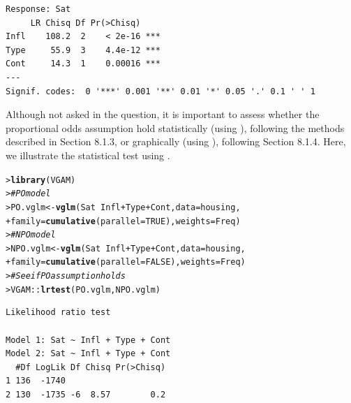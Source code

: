 \documentclass[10pt]{report}\usepackage[]{graphicx}\usepackage[]{color}
\makeatletter
\newcommand{\hlnum}[1]{\textcolor[rgb]{0.686,0.059,0.569}{#1}}%
\newcommand{\hlcom}[1]{\textcolor[rgb]{0.678,0.584,0.686}{\textit{#1}}}%
\newcommand{\hlopt}[1]{\textcolor[rgb]{0,0,0}{#1}}%
\newcommand{\hlstd}[1]{\textcolor[rgb]{0.345,0.345,0.345}{#1}}%
\newcommand{\hlkwb}[1]{\textcolor[rgb]{0.69,0.353,0.396}{#1}}%
\newcommand{\hlkwc}[1]{\textcolor[rgb]{0.333,0.667,0.333}{#1}}%
\newcommand{\hlkwd}[1]{\textcolor[rgb]{0.737,0.353,0.396}{\textbf{#1}}}%
\newenvironment{kframe}{%
 \def\at@end@of@kframe{}%
 \ifinner\ifhmode%
  \def\at@end@of@kframe{\end{minipage}}%
  \begin{minipage}{\columnwidth}%
 \fi\fi%
 \def\FrameCommand##1{\hskip\@totalleftmargin \hskip-\fboxsep
 \colorbox{shadecolor}{##1}\hskip-\fboxsep
     \hskip-\linewidth \hskip-\@totalleftmargin \hskip\columnwidth}%
 \MakeFramed {\advance\hsize-\width
   \@totalleftmargin\z@ \linewidth\hsize
   \@setminipage}}%
 {\par\unskip\endMakeFramed%
 \at@end@of@kframe}
\newenvironment{knitrout}{}{} %
\renewenvironment{knitrout}{\small\renewcommand{\baselinestretch}{.85}}{} %
\makeatother
\begin{document}
\begin{Exercises}
\begin{enumerate*}
\begin{ans}
\begin{knitrout}
\begin{kframe}
\begin{verbatim}
Response: Sat
     LR Chisq Df Pr(>Chisq)    
Infl    108.2  2    < 2e-16 ***
Type     55.9  3    4.4e-12 ***
Cont     14.3  1    0.00016 ***
---
Signif. codes:  0 '***' 0.001 '**' 0.01 '*' 0.05 '.' 0.1 ' ' 1
\end{verbatim}
\end{kframe}
\end{knitrout}
    Although not asked in the question, it is important to assess whether the proportional
    odds assumption hold statistically (using ),  following the methods described in Section 8.1.3, 
    or graphically (using ), following Section 8.1.4.  Here, we illustrate the statistical test
    using .
\begin{knitrout}\footnotesize
{}\color{fgcolor}\begin{kframe}
\begin{alltt}
\hlstd{> }\hlkwd{library}\hlstd{(VGAM)}
\hlstd{> }   \hlcom{# PO model}
\hlstd{> }\hlstd{PO.vglm} \hlkwb{<-} \hlkwd{vglm}\hlstd{(Sat} \hlopt{~} \hlstd{Infl} \hlopt{+} \hlstd{Type} \hlopt{+} \hlstd{Cont,} \hlkwc{data}\hlstd{=housing,}
\hlstd{+ }                \hlkwc{family}\hlstd{=}\hlkwd{cumulative}\hlstd{(}\hlkwc{parallel}\hlstd{=}\hlnum{TRUE}\hlstd{),} \hlkwc{weights}\hlstd{=Freq)}
\hlstd{> }   \hlcom{# NPO model}
\hlstd{> }\hlstd{NPO.vglm} \hlkwb{<-} \hlkwd{vglm}\hlstd{(Sat} \hlopt{~} \hlstd{Infl} \hlopt{+} \hlstd{Type} \hlopt{+} \hlstd{Cont,} \hlkwc{data}\hlstd{=housing,}
\hlstd{+ }                 \hlkwc{family}\hlstd{=}\hlkwd{cumulative}\hlstd{(}\hlkwc{parallel}\hlstd{=}\hlnum{FALSE}\hlstd{),} \hlkwc{weights}\hlstd{=Freq)}
\hlstd{> }   \hlcom{# See if PO assumption holds}
\hlstd{> }\hlstd{VGAM}\hlopt{::}\hlkwd{lrtest}\hlstd{(PO.vglm, NPO.vglm)}
\end{alltt}
\begin{verbatim}
Likelihood ratio test

Model 1: Sat ~ Infl + Type + Cont
Model 2: Sat ~ Infl + Type + Cont
  #Df LogLik Df Chisq Pr(>Chisq)
1 136  -1740                    
2 130  -1735 -6  8.57        0.2
\end{verbatim}
\end{kframe}
\end{knitrout}
    
    \end{ans}
    

\end{enumerate*}
\end{Exercises}
\end{document}
